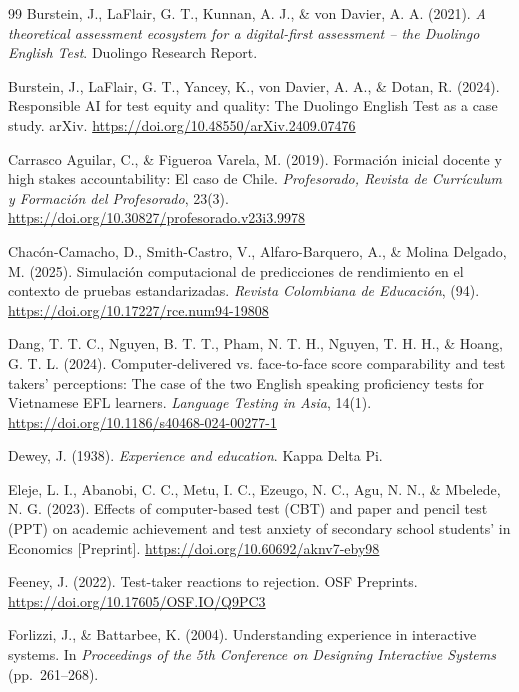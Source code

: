 \documentclass[11pt]{article}
\begin{document}
\begin{thebibliography}{99}
Burstein, J., LaFlair, G. T., Kunnan, A. J., \& von Davier, A. A. (2021). \textit{A theoretical assessment ecosystem for a digital-first assessment -- the Duolingo English Test}. Duolingo Research Report.

Burstein, J., LaFlair, G. T., Yancey, K., von Davier, A. A., \& Dotan, R. (2024). Responsible AI for test equity and quality: The Duolingo English Test as a case study. arXiv. \url{https://doi.org/10.48550/arXiv.2409.07476}

Carrasco Aguilar, C., \& Figueroa Varela, M. (2019). Formaci\'on inicial docente y high stakes accountability: El caso de Chile. \textit{Profesorado, Revista de Curr\'iculum y Formaci\'on del Profesorado}, 23(3). \url{https://doi.org/10.30827/profesorado.v23i3.9978}

Chac\'on-Camacho, D., Smith-Castro, V., Alfaro-Barquero, A., \& Molina Delgado, M. (2025). Simulaci\'on computacional de predicciones de rendimiento en el contexto de pruebas estandarizadas. \textit{Revista Colombiana de Educaci\'on}, (94). \url{https://doi.org/10.17227/rce.num94-19808}

Dang, T. T. C., Nguyen, B. T. T., Pham, N. T. H., Nguyen, T. H. H., \& Hoang, G. T. L. (2024). Computer-delivered vs. face-to-face score comparability and test takers' perceptions: The case of the two English speaking proficiency tests for Vietnamese EFL learners. \textit{Language Testing in Asia}, 14(1). \url{https://doi.org/10.1186/s40468-024-00277-1}

Dewey, J. (1938). \textit{Experience and education}. Kappa Delta Pi.

Eleje, L. I., Abanobi, C. C., Metu, I. C., Ezeugo, N. C., Agu, N. N., \& Mbelede, N. G. (2023). Effects of computer-based test (CBT) and paper and pencil test (PPT) on academic achievement and test anxiety of secondary school students' in Economics [Preprint]. \url{https://doi.org/10.60692/aknv7-eby98}

Feeney, J. (2022). Test-taker reactions to rejection. OSF Preprints. \url{https://doi.org/10.17605/OSF.IO/Q9PC3}

Forlizzi, J., \& Battarbee, K. (2004). Understanding experience in interactive systems. In \textit{Proceedings of the 5th Conference on Designing Interactive Systems} (pp.\ 261--268).


\end{thebibliography}
\end{document}
